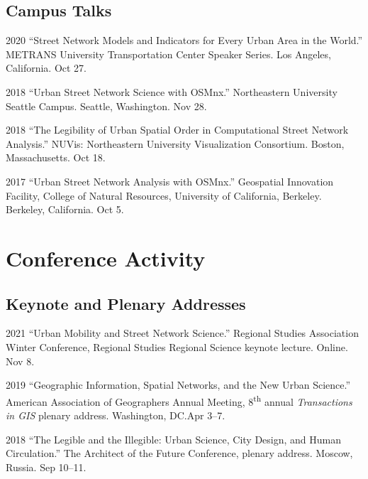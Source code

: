 \documentclass[12pt,letterpaper]{report}
\begin{document}
    \subsection*{Campus Talks}

    \begin{tablist}

        \item[2020] \tab{}\enquote{Street Network Models and Indicators for Every Urban Area in the World.} METRANS University Transportation Center Speaker Series. Los Angeles, California. Oct 27.

        \item[2018] \tab{}\enquote{Urban Street Network Science with OSMnx.} Northeastern University Seattle Campus. Seattle, Washington. Nov 28.

        \item[2018] \tab{}\enquote{The Legibility of Urban Spatial Order in Computational Street Network Analysis.} NUVis: Northeastern University Visualization Consortium. Boston, Massachusetts. Oct 18.

        \item[2017] \tab{}\enquote{Urban Street Network Analysis with OSMnx.} Geospatial Innovation Facility, College of Natural Resources, University of California, Berkeley. Berkeley, California. Oct 5.

    \end{tablist}



    \section*{Conference Activity}

    \subsection*{Keynote and Plenary Addresses}

    \begin{tablist}

        \item[2021] \tab{}\enquote{Urban Mobility and Street Network Science.} Regional Studies Association Winter Conference, Regional Studies Regional Science keynote lecture. Online. Nov 8.

        \item[2019] \tab{}\enquote{Geographic Information, Spatial Networks, and the New Urban Science.} American Association of Geographers Annual Meeting, 8\textsuperscript{th} annual \textit{Transactions in GIS} plenary address. Washington, DC.\@ Apr 3--7.

        \item[2018] \tab{}\enquote{The Legible and the Illegible: Urban Science, City Design, and Human Circulation.} The Architect of the Future Conference, plenary address. Moscow, Russia. Sep 10--11.

    \end{tablist}
\end{document}
